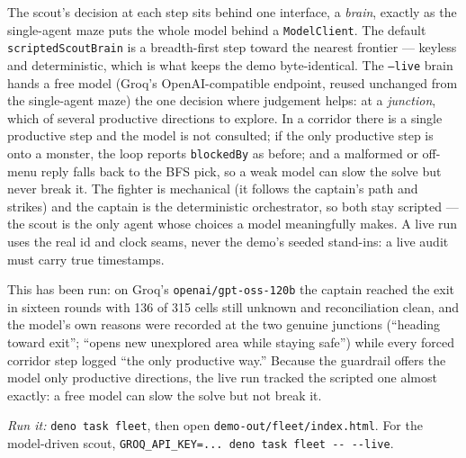 \documentclass[11pt]{article}
\newcommand{\code}[1]{\texttt{#1}}
\begin{document}
The scout's decision at each step sits behind one interface, a \emph{brain}, exactly
as the single-agent maze puts the whole model behind a \code{ModelClient}. The
default \code{scriptedScoutBrain} is a breadth-first step toward the nearest frontier
--- keyless and deterministic, which is what keeps the demo byte-identical. The
\code{--live} brain hands a free model (Groq's OpenAI-compatible endpoint, reused
unchanged from the single-agent maze) the one decision where judgement helps: at a
\emph{junction}, which of several productive directions to explore. In a corridor
there is a single productive step and the model is not consulted; if the only
productive step is onto a monster, the loop reports \code{blockedBy} as before; and a
malformed or off-menu reply falls back to the BFS pick, so a weak model can slow the
solve but never break it. The fighter is mechanical (it follows the captain's path
and strikes) and the captain is the deterministic orchestrator, so both stay
scripted --- the scout is the only agent whose choices a model meaningfully makes. A
live run uses the real id and clock seams, never the demo's seeded stand-ins: a
live audit must carry true timestamps.

This has been run: on Groq's \code{openai/gpt-oss-120b} the captain reached the exit
in sixteen rounds with 136 of 315 cells still unknown and reconciliation clean, and
the model's own reasons were recorded at the two genuine junctions (``heading toward
exit''; ``opens new unexplored area while staying safe'') while every forced corridor
step logged ``the only productive way.'' Because the guardrail offers the model only
productive directions, the live run tracked the scripted one almost exactly: a free
model can slow the solve but not break it.

\bigskip
\noindent\emph{Run it:} \code{deno task fleet}, then open
\code{demo-out/fleet/index.html}. For the model-driven scout,
\code{GROQ\_API\_KEY=... deno task fleet -{}- -{}-live}.
\end{document}
